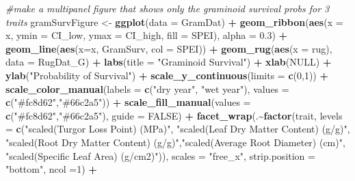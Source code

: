 \documentclass[
]{article}
\newenvironment{Shaded}{\begin{snugshade}}{\end{snugshade}}
\newcommand{\CommentTok}[1]{\textcolor[rgb]{0.56,0.35,0.01}{\textit{#1}}}
\newcommand{\DataTypeTok}[1]{\textcolor[rgb]{0.13,0.29,0.53}{#1}}
\newcommand{\DecValTok}[1]{\textcolor[rgb]{0.00,0.00,0.81}{#1}}
\newcommand{\FloatTok}[1]{\textcolor[rgb]{0.00,0.00,0.81}{#1}}
\newcommand{\KeywordTok}[1]{\textcolor[rgb]{0.13,0.29,0.53}{\textbf{#1}}}
\newcommand{\NormalTok}[1]{#1}
\newcommand{\OperatorTok}[1]{\textcolor[rgb]{0.81,0.36,0.00}{\textbf{#1}}}
\newcommand{\OtherTok}[1]{\textcolor[rgb]{0.56,0.35,0.01}{#1}}
\newcommand{\StringTok}[1]{\textcolor[rgb]{0.31,0.60,0.02}{#1}}
\begin{document}
\begin{Shaded}
\begin{Highlighting}[]
\CommentTok{\#make a multipanel figure that shows only the graminoid survival probs for 3 traits}
\NormalTok{gramSurvFigure \textless{}{-}}\StringTok{ }\KeywordTok{ggplot}\NormalTok{(}\DataTypeTok{data =}\NormalTok{ GramDat) }\OperatorTok{+}
\StringTok{  }\KeywordTok{geom\_ribbon}\NormalTok{(}\KeywordTok{aes}\NormalTok{(}\DataTypeTok{x =}\NormalTok{ x, }\DataTypeTok{ymin =}\NormalTok{ CI\_low, }\DataTypeTok{ymax =}\NormalTok{ CI\_high, }\DataTypeTok{fill =}\NormalTok{ SPEI), }\DataTypeTok{alpha =} \FloatTok{0.3}\NormalTok{) }\OperatorTok{+}
\StringTok{  }\KeywordTok{geom\_line}\NormalTok{(}\KeywordTok{aes}\NormalTok{(}\DataTypeTok{x=}\NormalTok{x, GramSurv, }\DataTypeTok{col =}\NormalTok{ SPEI))  }\OperatorTok{+}\StringTok{ }
\StringTok{  }\KeywordTok{geom\_rug}\NormalTok{(}\KeywordTok{aes}\NormalTok{(}\DataTypeTok{x =}\NormalTok{ rug), }\DataTypeTok{data =}\NormalTok{ RugDat\_G) }\OperatorTok{+}
\StringTok{  }\KeywordTok{labs}\NormalTok{(}\DataTypeTok{title =} \StringTok{"Graminoid Survival"}\NormalTok{) }\OperatorTok{+}
\StringTok{  }\KeywordTok{xlab}\NormalTok{(}\OtherTok{NULL}\NormalTok{) }\OperatorTok{+}
\StringTok{  }\KeywordTok{ylab}\NormalTok{(}\StringTok{"Probability of Survival"}\NormalTok{) }\OperatorTok{+}
\StringTok{  }\KeywordTok{scale\_y\_continuous}\NormalTok{(}\DataTypeTok{limits =} \KeywordTok{c}\NormalTok{(}\DecValTok{0}\NormalTok{,}\DecValTok{1}\NormalTok{)) }\OperatorTok{+}
\StringTok{  }\KeywordTok{scale\_color\_manual}\NormalTok{(}\DataTypeTok{labels =} \KeywordTok{c}\NormalTok{(}\StringTok{"dry year"}\NormalTok{, }\StringTok{"wet year"}\NormalTok{), }\DataTypeTok{values =} \KeywordTok{c}\NormalTok{(}\StringTok{"\#fc8d62"}\NormalTok{,}\StringTok{"\#66c2a5"}\NormalTok{)) }\OperatorTok{+}
\StringTok{  }\KeywordTok{scale\_fill\_manual}\NormalTok{(}\DataTypeTok{values =} \KeywordTok{c}\NormalTok{(}\StringTok{"\#fc8d62"}\NormalTok{,}\StringTok{"\#66c2a5"}\NormalTok{), }\DataTypeTok{guide =} \OtherTok{FALSE}\NormalTok{) }\OperatorTok{+}
\StringTok{  }\KeywordTok{facet\_wrap}\NormalTok{(.}\OperatorTok{\textasciitilde{}}\KeywordTok{factor}\NormalTok{(trait, }\DataTypeTok{levels =} \KeywordTok{c}\NormalTok{(}\StringTok{"scaled(Turgor Loss Point) (MPa)"}\NormalTok{, }\StringTok{"scaled(Leaf Dry Matter Content) (g/g)"}\NormalTok{, }\StringTok{"scaled(Root Dry Matter Content) (g/g)"}\NormalTok{,}\StringTok{"scaled(Average Root Diameter) (cm)"}\NormalTok{, }\StringTok{"scaled(Specific Leaf Area) (g/cm2)"}\NormalTok{)), }\DataTypeTok{scales =} \StringTok{"free\_x"}\NormalTok{, }\DataTypeTok{strip.position =}  \StringTok{"bottom"}\NormalTok{, }\DataTypeTok{ncol =}\DecValTok{1}\NormalTok{) }\OperatorTok{+}

\end{Highlighting}
\end{Shaded}
\end{document}
